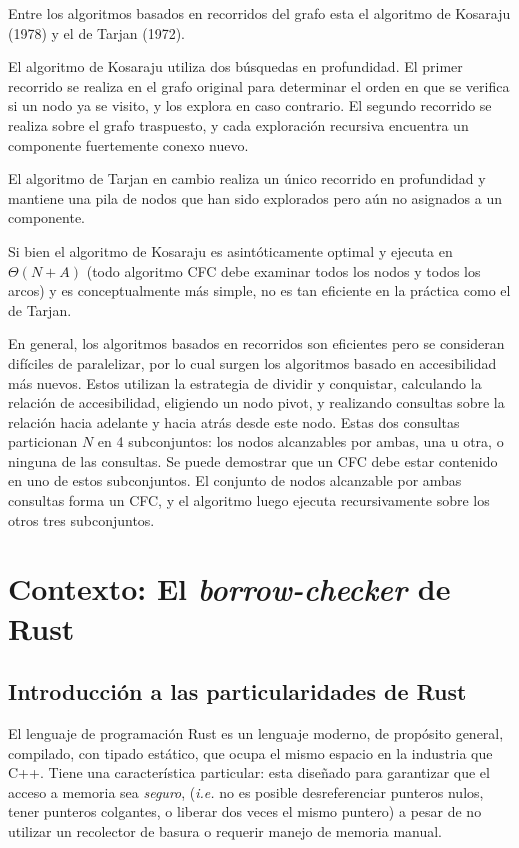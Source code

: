 \documentclass[11pt, a4paper]{article}
\begin{document}
Entre los algoritmos basados en recorridos del grafo esta el algoritmo de Kosaraju (1978) y el de Tarjan (1972).

El algoritmo de Kosaraju utiliza dos búsquedas en profundidad.
El primer recorrido se realiza en el grafo original para determinar el orden en que se verifica si un nodo ya se visito, y los explora en caso contrario.
El segundo recorrido se realiza sobre el grafo traspuesto, y cada exploración recursiva encuentra un componente fuertemente conexo nuevo.

El algoritmo de Tarjan en cambio realiza un único recorrido en profundidad y mantiene una pila de nodos que han sido explorados pero aún no asignados a un componente.

Si bien el algoritmo de Kosaraju es asintóticamente optimal y ejecuta en $\Theta(N+A)$ (todo algoritmo CFC debe examinar todos los nodos y todos los arcos) y es conceptualmente más simple, no es tan eficiente en la práctica como el de Tarjan.

En general, los algoritmos basados en recorridos son eficientes pero se consideran difíciles de paralelizar, por lo cual surgen los algoritmos basado en accesibilidad más nuevos.
Estos utilizan la estrategia de dividir y conquistar, calculando la relación de accesibilidad, eligiendo un nodo pivot, y realizando consultas sobre la relación hacia adelante y hacia atrás desde este nodo.
Estas dos consultas particionan $N$ en 4 subconjuntos: los nodos alcanzables por ambas, una u otra, o ninguna de las consultas.
Se puede demostrar que un CFC debe estar contenido en uno de estos subconjuntos.
El conjunto de nodos alcanzable por ambas consultas forma un CFC, y el algoritmo luego ejecuta recursivamente sobre los otros tres subconjuntos.

\section{Contexto: El \textit{borrow-checker} de Rust}

\subsection{Introducción a las particularidades de Rust}

El lenguaje de programación Rust es un lenguaje moderno, de propósito general, compilado, con tipado estático, que ocupa el mismo espacio en la industria que C++.
Tiene una característica particular: esta diseñado para garantizar que el acceso a memoria sea \textit{seguro}, (\textit{i.e.} no es posible desreferenciar punteros nulos, tener punteros colgantes, o liberar dos veces el mismo puntero) a pesar de no utilizar un recolector de basura o requerir manejo de memoria manual.
\end{document}
